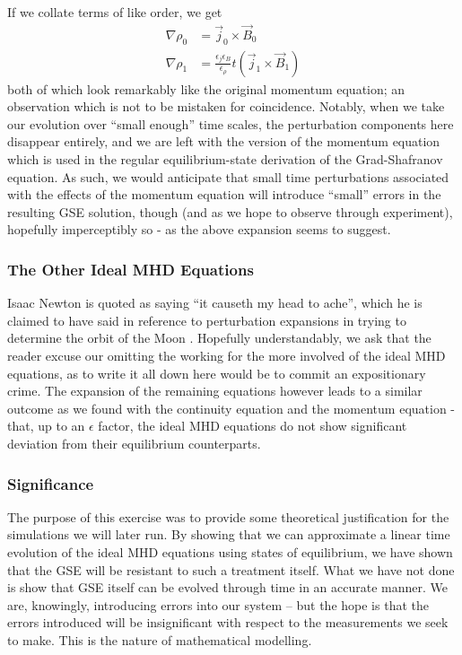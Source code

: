If we collate terms of like order, we get 
\begin{align*}
    \nabla \rho_0 &= \vec{j}_0 \times \vec{B}_0 \\
    \nabla \rho_1 &= \frac{\epsilon_j \epsilon_B}{\epsilon_\rho} t (\vec{j}_1 \times \vec{B}_1) 
\end{align*}
both of which look remarkably like the original momentum equation; an observation which is not to be mistaken for coincidence. Notably, when we take our 
evolution over ``small enough'' time scales, the perturbation components here disappear entirely, and we are left with the version of the 
momentum equation which is used in the regular equilibrium-state derivation of the Grad-Shafranov equation. As such, we would anticipate that 
small time perturbations associated with the effects of the momentum equation will introduce ``small'' errors in the resulting GSE solution, though 
(and as we hope to observe through experiment), hopefully imperceptibly so - as the above expansion seems to suggest.  

\subsubsection{The Other Ideal MHD Equations}
Isaac Newton is quoted as saying ``it causeth my head to ache'', which he is claimed to have said in reference to perturbation expansions 
in trying to determine the orbit of the Moon \cite{newton-headache}. Hopefully understandably, we ask that the reader excuse our omitting the working for the more involved of the ideal MHD equations, 
as to write it all down here would be to commit an expositionary crime. The expansion of the remaining equations however leads to a similar outcome 
as we found with the continuity equation and the momentum equation - that, up to an $\epsilon$ factor, the ideal MHD equations do not show significant deviation 
from their equilibrium counterparts. 

\subsubsection{Significance}
The purpose of this exercise was to provide some theoretical justification for the simulations we will later run. By showing that we can 
approximate a linear time evolution of the ideal MHD equations using states of equilibrium, we have shown that the GSE will be resistant 
to such a treatment itself. What we have not done is show that GSE itself can be evolved through time in an accurate manner. We are, knowingly, 
introducing errors into our system -- but the hope is that the errors introduced will be insignificant with respect to the measurements we seek to make. 
This is the nature of mathematical modelling.

